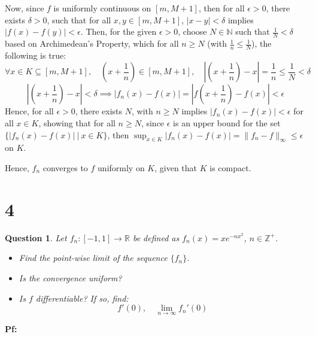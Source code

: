 \documentclass{article}
\newtheorem{question}{Question}
\begin{document}
\begin{itemize}
    Now, since $f$ is uniformly continuous on $[m,M+1]$, then for all $\epsilon>0$, there exists $\delta>0$, such that for all $x,y\in[m,M+1]$, $|x-y|<\delta$ implies $|f(x)-f(y)|<\epsilon$.
    Then, for the given $\epsilon>0$, choose $N\in\mathbb{N}$ such that $\frac{1}{N}<\delta$ based on Archimedean's Property, which for all $n\geq N$ (with $\frac{1}{n}\leq \frac{1}{N}$), the following is true:
    $$\forall x\in K\subseteq [m,M+1],\quad \left(x+\frac{1}{n}\right)\in [m,M+1],\quad \left|\left(x+\frac{1}{n}\right)-x\right| = \frac{1}{n}\leq \frac{1}{N}<\delta$$
    $$\left|\left(x+\frac{1}{n}\right)-x\right| <\delta \implies |f_n(x)-f(x)| = \left|f\left(x+\frac{1}{n}\right)-f(x)\right| < \epsilon$$
    Hence, for all $\epsilon>0$, there exists $N$, with $n\geq N$ implies $|f_n(x)-f(x)|<\epsilon$ for all $x\in K$,
    showing that for all $n\geq N$, since $\epsilon$ is an upper bound for the set $\{|f_n(x)-f(x)|\ |\ x\in K\}$, then $\sup_{x\in K}|f_n(x)-f(x)| = \|f_n-f\|_{\infty} \leq \epsilon$ on $K$.

    Hence, $f_n$ converges to $f$ uniformly on $K$, given that $K$ is compact.
\end{itemize}

\break

\section*{4}
\begin{myBox}[]{}
    \begin{question}
        Let $f_n:[-1,1]\rightarrow\mathbb{R}$ be defined as $f_n(x)=xe^{-nx^2}$, $n\in\mathbb{Z}^+$.
        \begin{itemize}
            \item[(a)] Find the point-wise limit of the sequence $\{f_n\}$.
            \item[(b)] Is the convergence uniform?
            \item[(c)] Is $f$ differentiable? If so, find:
            $$f'(0),\quad \lim_{n\rightarrow \infty}f_n'(0)$$
        \end{itemize}
    \end{question}
\end{myBox}

\textbf{Pf:}
\end{document}
